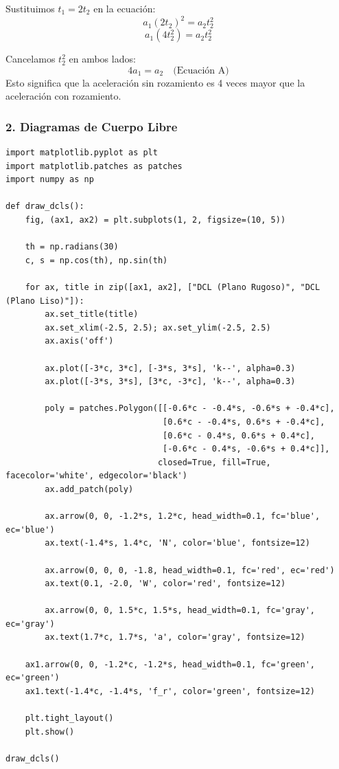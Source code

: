 \documentclass[12pt, a4paper]{article}
\begin{document}
Sustituimos $t_1 = 2 t_2$ en la ecuación:
$$ a_1 (2 t_2)^2 = a_2 t_2^2 $$
$$ a_1 (4 t_2^2) = a_2 t_2^2 $$

Cancelamos $t_2^2$ en ambos lados:
$$ 4 a_1 = a_2 \quad \text{(Ecuación A)} $$
Esto significa que la aceleración sin rozamiento es 4 veces mayor que la aceleración con rozamiento.

\subsubsection*{2. Diagramas de Cuerpo Libre}
\begin{lstlisting}
import matplotlib.pyplot as plt
import matplotlib.patches as patches
import numpy as np

def draw_dcls():
    fig, (ax1, ax2) = plt.subplots(1, 2, figsize=(10, 5))
    
    th = np.radians(30)
    c, s = np.cos(th), np.sin(th)
    
    for ax, title in zip([ax1, ax2], ["DCL (Plano Rugoso)", "DCL (Plano Liso)"]):
        ax.set_title(title)
        ax.set_xlim(-2.5, 2.5); ax.set_ylim(-2.5, 2.5)
        ax.axis('off')
        
        ax.plot([-3*c, 3*c], [-3*s, 3*s], 'k--', alpha=0.3)
        ax.plot([-3*s, 3*s], [3*c, -3*c], 'k--', alpha=0.3)
        
        poly = patches.Polygon([[-0.6*c - -0.4*s, -0.6*s + -0.4*c], 
                                [0.6*c - -0.4*s, 0.6*s + -0.4*c], 
                                [0.6*c - 0.4*s, 0.6*s + 0.4*c], 
                                [-0.6*c - 0.4*s, -0.6*s + 0.4*c]], 
                               closed=True, fill=True, facecolor='white', edgecolor='black')
        ax.add_patch(poly)
        
        ax.arrow(0, 0, -1.2*s, 1.2*c, head_width=0.1, fc='blue', ec='blue')
        ax.text(-1.4*s, 1.4*c, 'N', color='blue', fontsize=12)
        
        ax.arrow(0, 0, 0, -1.8, head_width=0.1, fc='red', ec='red')
        ax.text(0.1, -2.0, 'W', color='red', fontsize=12)
        
        ax.arrow(0, 0, 1.5*c, 1.5*s, head_width=0.1, fc='gray', ec='gray')
        ax.text(1.7*c, 1.7*s, 'a', color='gray', fontsize=12)
    
    ax1.arrow(0, 0, -1.2*c, -1.2*s, head_width=0.1, fc='green', ec='green')
    ax1.text(-1.4*c, -1.4*s, 'f_r', color='green', fontsize=12)
    
    plt.tight_layout()
    plt.show()

draw_dcls()
\end{lstlisting}
\end{document}
